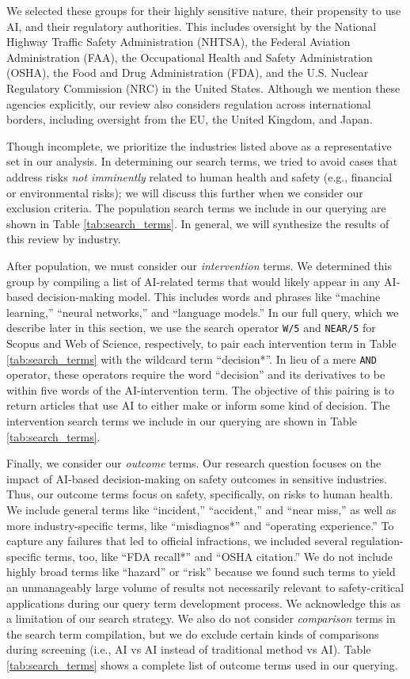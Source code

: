 \documentclass[authoryear,preprint,12pt]{elsarticle}
\begin{document}
We selected these groups for their highly sensitive nature, their propensity to
use AI, and their regulatory authorities. This includes oversight by the
National Highway Traffic Safety Administration (NHTSA), the Federal Aviation
Administration (FAA), the Occupational Health and Safety Administration (OSHA),
the Food and Drug Administration (FDA), and the U.S. Nuclear Regulatory
Commission (NRC) in the United States. Although we mention these agencies
explicitly, our review also considers regulation across international borders,
including oversight from the EU, the United Kingdom, and Japan. 

Though incomplete, we prioritize the industries listed above as a representative
set in our analysis. In determining our search terms, we tried to avoid cases
that address risks \textit{not imminently} related to human health and safety
(e.g., financial or environmental risks); we will discuss this further when we
consider our exclusion criteria. The population search terms we include in our
querying are shown in Table \ref{tab:search_terms}. In general, we will synthesize the results of this review by industry.

After population, we must consider our \textit{intervention} terms. We
determined this group by compiling a list of AI-related terms that would likely
appear in any AI-based decision-making model. This includes words and phrases
like ``machine learning,'' ``neural networks,'' and ``language models.'' In our
full query, which we describe later in this section, we use the search operator
\verb|W/5| and \verb|NEAR/5| for Scopus and Web of Science, respectively, to
pair each intervention term in Table \ref{tab:search_terms} with the wildcard
term ``decision*''. In lieu of a mere \verb|AND| operator, these operators
require the word ``decision'' and its derivatives to be within five words of the
AI-intervention term. The objective of this pairing is to return articles that
use AI to either make or inform some kind of decision. The intervention search
terms we include in our querying are shown in Table \ref{tab:search_terms}. 

Finally, we consider our \textit{outcome} terms. Our research question focuses
on the impact of AI-based decision-making on safety outcomes in sensitive
industries. Thus, our outcome terms focus on safety, specifically, on risks to
human health. We include general terms like ``incident,'' ``accident,'' and
``near miss,''  as well as more industry-specific terms, like ``misdiagnos*''
and ``operating experience.'' To capture any failures that led to official
infractions, we included several regulation-specific terms, too, like ``FDA
recall*'' and ``OSHA citation.'' We do not include highly broad terms like ``hazard'' or ``risk'' because we found such terms to yield an unmanageably large volume of results not necessarily relevant to safety-critical applications during our query term development process. We acknowledge this as a limitation of our search strategy. We also do not consider \textit{comparison} terms in
the search term compilation, but we do exclude certain kinds of comparisons
during screening (i.e., AI vs AI instead of traditional method vs AI). Table
\ref{tab:search_terms} shows a complete list of outcome terms used in our
querying. 
\end{document}
